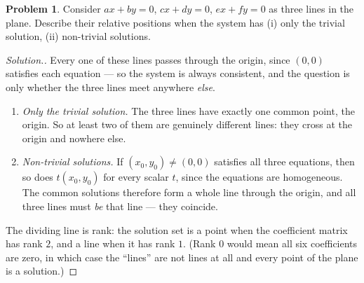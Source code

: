 \documentclass[11pt,a4paper]{article}
\theoremstyle{definition}
\newtheorem{problemx}{Problem}[section]
\newenvironment{problem}{\begin{problemx}}{\end{problemx}}
\newenvironment{solution}
  {\renewcommand{\qedsymbol}{}\begin{proof}[\textit{Solution}.]}
  {\end{proof}}
\begin{document}
\begin{problem}
Consider $ax+by=0$, $cx+dy=0$, $ex+fy=0$ as three lines in the plane. Describe
their relative positions when the system has (i) only the trivial solution,
(ii) non-trivial solutions.
\end{problem}
\begin{solution}
Every one of these lines passes through the origin, since $(0,0)$ satisfies
each equation --- so the system is always consistent, and the question is only
whether the three lines meet anywhere \emph{else}.

\begin{enumerate}
\item[(i)] \emph{Only the trivial solution.} The three lines have exactly one
common point, the origin. So at least two of them are genuinely different
lines: they cross at the origin and nowhere else.

\item[(ii)] \emph{Non-trivial solutions.} If $(x_0,y_0)\neq(0,0)$ satisfies all
three equations, then so does $t(x_0,y_0)$ for every scalar $t$, since the
equations are homogeneous. The common solutions therefore form a whole line
through the origin, and all three lines must \emph{be} that line --- they
coincide.
\end{enumerate}
The dividing line is rank: the solution set is a point when the coefficient
matrix has rank $2$, and a line when it has rank $1$. (Rank $0$ would mean all
six coefficients are zero, in which case the ``lines'' are not lines at all and
every point of the plane is a solution.)
\end{solution}
\end{document}
